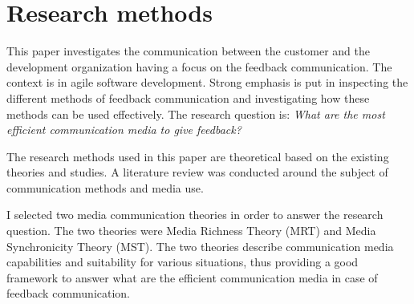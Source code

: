 \documentclass[conference]{IEEEtran}
\begin{document}
\begin{comment}

\subsection{Video conference and telephone}

\subsection{Email}

\subsection{Chat rooms}

\textbf{TODO: Synchronous vs. asynchonous methods, Email, Video conference, documents etc.}

\section{Communication and feedback methods in software projects}

\end{comment}

\section{Research methods}

This paper investigates the communication between the customer and the development organization having a focus on the feedback communication. The context is in agile software development. Strong emphasis is put in inspecting the different methods of feedback communication and investigating how these methods can be used effectively. The research question is: \textit{What are the most efficient communication media to give feedback?}

The research methods used in this paper are theoretical based on the existing theories and studies. A literature review was conducted around the subject of communication methods and media use.

I selected two media communication theories in order to answer the research question. The two theories were Media Richness Theory (MRT) and Media Synchronicity Theory (MST). The two theories describe communication media capabilities and suitability for various situations, thus providing a good framework to answer what are the efficient communication media in case of feedback communication.
\end{document}
